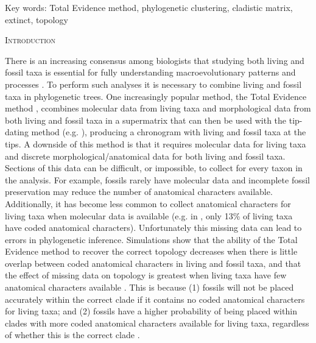 \documentclass[12pt,letterpaper]{article}
\renewcommand{\section}[1]{%
\bigskip
\begin{center}
\begin{Large}
\normalfont\scshape #1
\medskip
\end{Large}
\end{center}}
\begin{document}
\noindent Key words: Total Evidence method, phylogenetic clustering, cladistic matrix, extinct, topology\\

\vspace{1.5in}

%
%
\newpage 
\section{Introduction}
There is an increasing consensus among biologists that studying both living and fossil taxa is essential for fully understanding macroevolutionary patterns and processes \cite{slaterunifying2013,fritzdiversity2013}.
To perform such analyses it is necessary to combine living and fossil taxa in phylogenetic trees.
One increasingly popular method, the Total Evidence method \cite{ronquista2012}, ccombines molecular data from living taxa and morphological data from both living and fossil taxa in a supermatrix that can then be used with the tip-dating method (e.g. \cite{pyrondivergence2011,ronquista2012,schragocombining2013,slaterunifying2013,beckancient2014}), producing a chronogram with living and fossil taxa at the tips.
A downside of this method is that it requires molecular data for living taxa and discrete morphological/anatomical data for both living and fossil taxa.
Sections of this data can be difficult, or impossible, to collect for every taxon in the analysis.
For example, fossils rarely have molecular data and incomplete fossil preservation may reduce the number of anatomical characters available.
Additionally, it has become less common to collect anatomical characters for living taxa when molecular data is available (e.g. in \cite{slaterphylogenetic2013}, only 13\% of living taxa have coded anatomical characters).
Unfortunately this missing data can lead to errors in phylogenetic inference.
Simulations show that the ability of the Total Evidence method to recover the correct topology decreases when there is little overlap between coded anatomical characters in living and fossil taxa, and that the effect of missing data on topology is greatest when living taxa have few anatomical characters available \cite{GuillermeCooper}.
This is because (1) fossils will not be placed accurately within the correct clade if it contains no coded anatomical characters for living taxa; and (2) fossils have a higher probability of being placed within clades with more coded anatomical characters available for living taxa, regardless of whether this is the correct clade \cite{GuillermeCooper}. 
\end{document}
